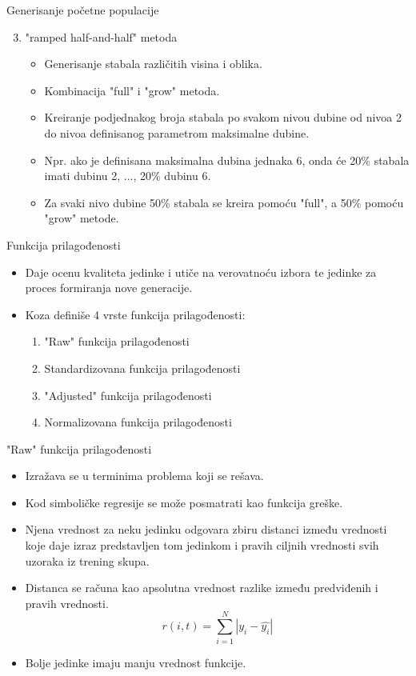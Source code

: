 \documentclass{beamer}
\begin{document}
\begin{frame}{Generisanje početne populacije}
\begin{enumerate}
\setcounter{enumi}{2}
    \item "ramped half-and-half" metoda
        \begin{itemize}
            \item Generisanje stabala različitih visina i oblika.
            \item Kombinacija "full" i "grow" metoda.
            \item Kreiranje podjednakog broja stabala po svakom nivou dubine od nivoa 2 do nivoa definisanog parametrom maksimalne dubine.
            \item Npr. ako je definisana maksimalna dubina jednaka 6, onda će 20\% stabala imati dubinu 2, ..., 20\% dubinu 6.
            \item Za svaki nivo dubine 50\% stabala se kreira pomoću "full", a 50\% pomoću "grow" metode.
        \end{itemize}
\end{enumerate}
\end{frame}

\begin{frame}{Funkcija prilagođenosti}
\begin{itemize}
    \item Daje ocenu kvaliteta jedinke i utiče na verovatnoću izbora te jedinke za proces formiranja nove generacije.
    \item Koza definiše 4 vrste funkcija prilagod̄enosti:
    \begin{enumerate}
    \item "Raw" funkcija prilagođenosti
    \item Standardizovana funkcija prilagođenosti 
    \item "Adjusted" funkcija prilagođenosti 
    \item Normalizovana funkcija prilagođenosti
    \end{enumerate}
\end{itemize}
\end{frame}

\begin{frame}{"Raw" funkcija prilagođenosti}
\begin{itemize}
    \item Izražava se u terminima problema koji se rešava.
    \item Kod simboličke regresije se može posmatrati kao funkcija greške.
    \item Njena vrednost za neku jedinku odgovara zbiru distanci između vrednosti koje daje izraz predstavljen tom jedinkom i pravih ciljnih vrednosti svih uzoraka iz trening skupa.
    \item  Distanca se računa kao apsolutna vrednost razlike između predviđenih i pravih vrednosti.
    \[ r(i,t) = \sum_{i=1}^{N}|y_i - \hat{y_i}|  \]
    \item Bolje jedinke imaju manju vrednost funkcije.
\end{itemize}
\end{frame}
\end{document}
